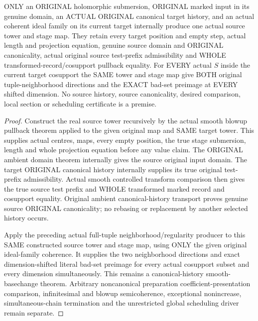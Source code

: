 \begin{theorem}
\label{hir:original-canonical-smooth-history-full-tuple-variation-producer}
\leanok
ONLY an ORIGINAL holomorphic submersion, ORIGINAL marked input in its
genuine domain, an ACTUAL ORIGINAL canonical target history, and an
actual coherent ideal family on its current target internally produce
one actual source tower and stage map. They retain every target position
and empty step, actual length and projection equation, genuine source
domain and ORIGINAL canonicality, actual original source test-prefix
admissibility and WHOLE transformed-record/cosupport pullback equality.
For EVERY actual $S$ inside the current target cosupport the SAME tower
and stage map give BOTH original tuple-neighborhood directions and the
EXACT bad-set preimage at EVERY shifted dimension. No source history,
source canonicality, desired comparison, local section or scheduling
certificate is a premise.
\end{theorem}
\begin{proof}
Construct the real source tower recursively by the actual smooth blowup
pullback theorem applied to the given original map and SAME target tower.
This supplies actual centres, maps, every empty position, the true stage
submersion, length and whole projection equation before any value claim.
The ORIGINAL ambient domain theorem internally gives the source original
input domain. The target ORIGINAL canonical history internally supplies
its true original test-prefix admissibility. Actual smooth controlled
transform comparison then gives the true source test prefix and WHOLE
transformed marked record and cosupport equality. Original ambient
canonical-history transport proves genuine source ORIGINAL canonicality;
no rebasing or replacement by another selected history occurs.

Apply the preceding actual full-tuple neighborhood/regularity producer
to this SAME constructed source tower and stage map, using ONLY the given
original ideal-family coherence. It supplies the two neighborhood
directions and exact dimension-shifted literal bad-set preimage for every
actual cosupport subset and every dimension simultaneously. This remains
a canonical-history smooth-basechange theorem. Arbitrary noncanonical
preparation coefficient-presentation comparison, infinitesimal and
blowup semicoherence, exceptional nonincrease, simultaneous-chain
termination and the unrestricted global scheduling driver remain separate.
\end{proof}
